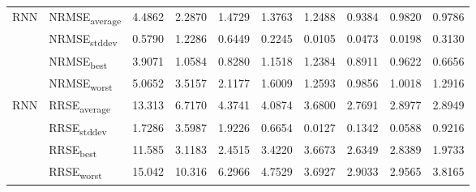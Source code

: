 {\begin{longtable}{l l c c c c c c c c}
\cmidrule(lr){2-10}
\multirow{4}{*}{RNN} & NRMSE\textsubscript{average} & 4.4862 & 2.2870 & 1.4729 & 1.3763 & 1.2488 & 0.9384 & 0.9820 & 0.9786 \\
 & NRMSE\textsubscript{stddev} & 0.5790 & 1.2286 & 0.6449 & 0.2245 & 0.0105 & 0.0473 & 0.0198 & 0.3130 \\
 & NRMSE\textsubscript{best} & 3.9071 & 1.0584 & 0.8280 & 1.1518 & 1.2384 & 0.8911 & 0.9622 & 0.6656 \\
 & NRMSE\textsubscript{worst} & 5.0652 & 3.5157 & 2.1177 & 1.6009 & 1.2593 & 0.9856 & 1.0018 & 1.2916 \\
\cmidrule(lr){2-10}
\multirow{4}{*}{RNN} & RRSE\textsubscript{average} & 13.313 & 6.7170 & 4.3741 & 4.0874 & 3.6800 & 2.7691 & 2.8977 & 2.8949 \\
 & RRSE\textsubscript{stddev} & 1.7286 & 3.5987 & 1.9226 & 0.6654 & 0.0127 & 0.1342 & 0.0588 & 0.9216 \\
 & RRSE\textsubscript{best} & 11.585 & 3.1183 & 2.4515 & 3.4220 & 3.6673 & 2.6349 & 2.8389 & 1.9733 \\
 & RRSE\textsubscript{worst} & 15.042 & 10.316 & 6.2966 & 4.7529 & 3.6927 & 2.9033 & 2.9565 & 3.8165 \\
\cmidrule(lr){2-10}
\end{longtable}
}